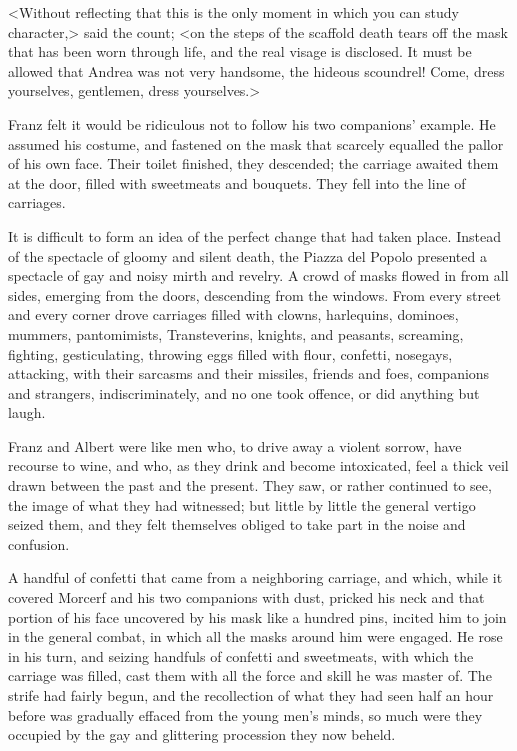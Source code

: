<Without reflecting that this is the only moment in which you can study character,> said the count; <on the steps of the scaffold death tears off the mask that has been worn through life, and the real visage is disclosed. It must be allowed that Andrea was not very handsome, the hideous scoundrel! Come, dress yourselves, gentlemen, dress yourselves.> 

 Franz felt it would be ridiculous not to follow his two companions' example. He assumed his costume, and fastened on the mask that scarcely equalled the pallor of his own face. Their toilet finished, they descended; the carriage awaited them at the door, filled with sweetmeats and bouquets. They fell into the line of carriages. 

 It is difficult to form an idea of the perfect change that had taken place. Instead of the spectacle of gloomy and silent death, the Piazza del Popolo presented a spectacle of gay and noisy mirth and revelry. A crowd of masks flowed in from all sides, emerging from the doors, descending from the windows. From every street and every corner drove carriages filled with clowns, harlequins, dominoes, mummers, pantomimists, Transteverins, knights, and peasants, screaming, fighting, gesticulating, throwing eggs filled with flour, confetti, nosegays, attacking, with their sarcasms and their missiles, friends and foes, companions and strangers, indiscriminately, and no one took offence, or did anything but laugh. 

 Franz and Albert were like men who, to drive away a violent sorrow, have recourse to wine, and who, as they drink and become intoxicated, feel a thick veil drawn between the past and the present. They saw, or rather continued to see, the image of what they had witnessed; but little by little the general vertigo seized them, and they felt themselves obliged to take part in the noise and confusion. 

 A handful of confetti that came from a neighboring carriage, and which, while it covered Morcerf and his two companions with dust, pricked his neck and that portion of his face uncovered by his mask like a hundred pins, incited him to join in the general combat, in which all the masks around him were engaged. He rose in his turn, and seizing handfuls of confetti and sweetmeats, with which the carriage was filled, cast them with all the force and skill he was master of.  The strife had fairly begun, and the recollection of what they had seen half an hour before was gradually effaced from the young men's minds, so much were they occupied by the gay and glittering procession they now beheld. 

